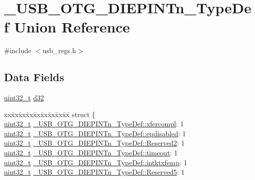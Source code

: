 \hypertarget{union___u_s_b___o_t_g___d_i_e_p_i_n_tn___type_def}{\section{\-\_\-\-U\-S\-B\-\_\-\-O\-T\-G\-\_\-\-D\-I\-E\-P\-I\-N\-Tn\-\_\-\-Type\-Def Union Reference}
\label{union___u_s_b___o_t_g___d_i_e_p_i_n_tn___type_def}
}


{\ttfamily \#include $<$usb\-\_\-regs.\-h$>$}

\subsection*{Data Fields}
\begin{DoxyCompactItemize}
\item 
\hyperlink{stdint_8h_a435d1572bf3f880d55459d9805097f62}{uint32\-\_\-t} \hyperlink{group___u_s_b___o_t_g___d_r_i_v_e_r_ga99c655451b8e7c36e5cffe80238d8def}{d32}
\item 
\begin{tabbing}
xx\=xx\=xx\=xx\=xx\=xx\=xx\=xx\=xx\=\kill
struct \{\\
\>\hyperlink{stdint_8h_a435d1572bf3f880d55459d9805097f62}{uint32\_t} \hyperlink{group___u_s_b___o_t_g___d_r_i_v_e_r_ga03b1ad5ac06af458fc8d10eee710ceb5}{\_USB\_OTG\_DIEPINTn\_TypeDef::xfercompl}: 1\\
\>\hyperlink{stdint_8h_a435d1572bf3f880d55459d9805097f62}{uint32\_t} \hyperlink{group___u_s_b___o_t_g___d_r_i_v_e_r_ga300352b16393687c3156329c5448b4b8}{\_USB\_OTG\_DIEPINTn\_TypeDef::epdisabled}: 1\\
\>\hyperlink{stdint_8h_a435d1572bf3f880d55459d9805097f62}{uint32\_t} \hyperlink{group___u_s_b___o_t_g___d_r_i_v_e_r_ga651638e82db2efdf3fa0b9c653008668}{\_USB\_OTG\_DIEPINTn\_TypeDef::Reserved2}: 1\\
\>\hyperlink{stdint_8h_a435d1572bf3f880d55459d9805097f62}{uint32\_t} \hyperlink{group___u_s_b___o_t_g___d_r_i_v_e_r_gaedd142332bb66001ab7d866e151c1950}{\_USB\_OTG\_DIEPINTn\_TypeDef::timeout}: 1\\
\>\hyperlink{stdint_8h_a435d1572bf3f880d55459d9805097f62}{uint32\_t} \hyperlink{group___u_s_b___o_t_g___d_r_i_v_e_r_gace8bd424f49bb9281260714fc42c035b}{\_USB\_OTG\_DIEPINTn\_TypeDef::intktxfemp}: 1\\
\>\hyperlink{stdint_8h_a435d1572bf3f880d55459d9805097f62}{uint32\_t} \hyperlink{group___u_s_b___o_t_g___d_r_i_v_e_r_ga57dcc37b8c90609671d6dfed1d8693c1}{\_USB\_OTG\_DIEPINTn\_TypeDef::Reserved5}: 1\\

\end{tabbing}
\end{DoxyCompactItemize}
